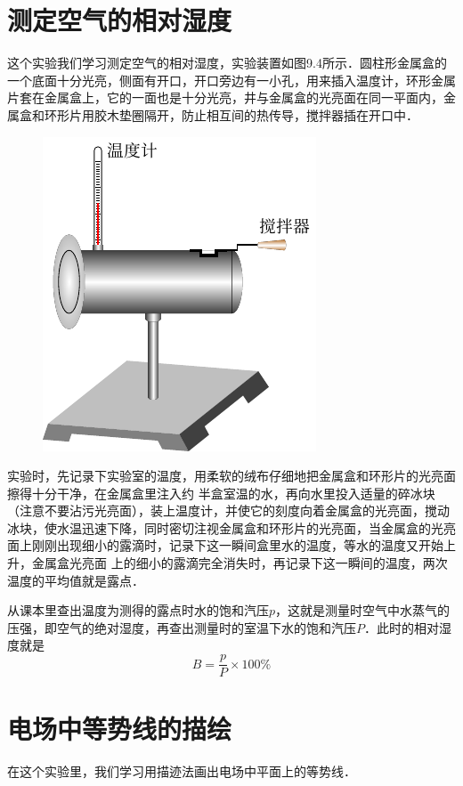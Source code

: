 \section{测定空气的相对湿度}
这个实验我们学习测定空气的相对湿度，实验装置如图9.4所示．圆柱形金属盒的一个底面十分光亮，侧面有开口，开口旁边有一小孔，用来插入温度计，环形金属片套在金属盒上，它的一面也是十分光亮，井与金属盒的光亮面在同一平面内，金属盒和环形片用胶木垫圈隔开，防止相互间的热传导，搅拌器插在开口中．
\begin{figure}[htbp]
    \centering
    \includegraphics{fig/B/9-4.pdf}
    \caption{}\label{fig_B_9-4}
\end{figure}

实验时，先记录下实验室的温度，用柔软的绒布仔细地把金属盒和环形片的光亮面擦得十分干净，在金属盒里注入约
半盒室温的水，再向水里投入适量的碎冰块（注意不要沾污光亮面），装上温度计，并使它的刻度向着金属盒的光亮面，搅动冰块，使水温迅速下降，同时密切注视金属盒和环形片的光亮面，当金属盒的光亮面上刚刚出现细小的露滴时，记录下这一瞬间盒里水的温度，等水的温度又开始上升，金属盒光亮面
上的细小的露滴完全消失时，再记录下这一瞬间的温度，两次温度的平均值就是露点．

从课本里查出温度为测得的露点时水的饱和汽压$p$，这就是测量时空气中水蒸气的压强，即空气的绝对湿度，再查出测量时的室温下水的饱和汽压$P$．此时的相对湿度就是
\[B=\frac{p}{P}\times 100\%\]

\section{电场中等势线的描绘}
在这个实验里，我们学习用描迹法画出电场中平面上的等势线．

